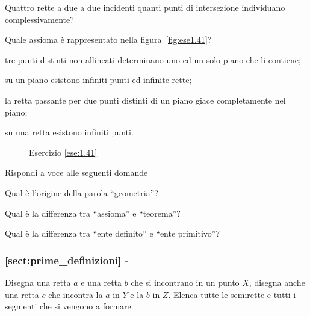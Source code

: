 \begin{esercizio}
Quattro rette a due a due incidenti quanti punti di intersezione 
individuano complessivamente?
\end{esercizio}

\begin{esercizio}
Quale assioma è rappresentato nella figura~\ref{fig:ese1.41}?
\begin{enumeratea}
\item tre punti distinti non allineati determinano uno ed un solo 
piano che li contiene;
\item su un piano esistono infiniti punti ed infinite rette;
\item la retta passante per due punti distinti di un piano giace 
completamente nel piano;
\item su una retta esistono infiniti punti.
\end{enumeratea}
\end{esercizio}


\begin{inaccessibleblock}
 \begin{figure}[htb]
 \centering
 \caption{Esercizio \ref{ese:1.41}}%
\end{figure}
\end{inaccessibleblock}

\begin{esercizio}
Rispondi a voce alle seguenti domande
\begin{enumeratea}
\item Qual è l'origine della parola ``geometria''?
\item Qual è la differenza tra ``assioma'' e ``teorema''?
\item Qual è la differenza tra ``ente definito'' e ``ente primitivo''?
\end{enumeratea}
\end{esercizio}

\begingroup
\hypersetup{linkcolor=black}
\subsubsection*{\ref{sect:prime_definizioni} - 
}
\endgroup

\begin{esercizio}
Disegna una retta \(a\) e una retta \(b\) che si incontrano in un punto 
\(X\), disegna anche una retta \(c\) che incontra la \(a\) in \(Y\) e la 
\(b\) 
in \(Z\). Elenca tutte le semirette e tutti i segmenti che si vengono a 
formare.
\end{esercizio}

